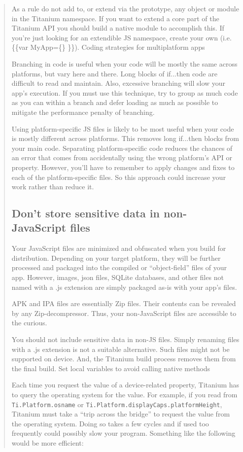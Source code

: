 \documentclass[11pt]{book}
\begin{document}
\begin{quotation}
As a rule do not add to, or extend via the prototype, any object or module in the Titanium namespace. If you want to extend a core part of the Titanium API you should build a native module to accomplish this. If you're just looking for an extendible JS namespace, create your own (i.e. \{\{var MyApp=\{\} \}\}).
Coding strategies for multiplatform apps

Branching in code is useful when your code will be mostly the same across platforms, but vary here and there. Long blocks of if...then code are difficult to read and maintain. Also, excessive branching will slow your app's execution. If you must use this technique, try to group as much code as you can within a branch and defer loading as much as possible to mitigate the performance penalty of branching.

Using platform-specific JS files is likely to be most useful when your code is mostly different across platforms. This removes long if...then blocks from your main code. Separating platform-specific code reduces the chances of an error that comes from accidentally using the wrong platform's API or property. However, you'll have to remember to apply changes and fixes to each of the platform-specific files. So this approach could increase your work rather than reduce it. 

\subsection{Don't store sensitive data in non-JavaScript files}
Your JavaScript files are minimized and obfuscated when you build for distribution. Depending on your target platform, they will be further processed and packaged into the compiled or ``object-field'' files of your app. However, images, \gls{json} files, SQLite databases, and other files not named with a .js extension are simply packaged as-is with your app's files.

APK and IPA files are essentially Zip files. Their contents can be revealed by any Zip-decompressor. Thus, your non-JavaScript files are accessible to the curious.

You should not include sensitive data in non-JS files. Simply renaming files with a .js extension is not a suitable alternative. Such files might not be supported on device. And, the Titanium build process removes them from the final build.
Set local variables to avoid calling native methods

Each time you request the value of a device-related property, Titanium has to query the operating system for the value. For example, if you read from \texttt{Ti.Platform.osname} or \texttt{Ti.Platform.displayCaps.platformHeight}, Titanium must take a ``trip across the bridge'' to request the value from the operating system. Doing so takes a few cycles and if used too frequently could possibly slow your program. Something like the following would be more efficient: %


\end{quotation}
\end{document}
